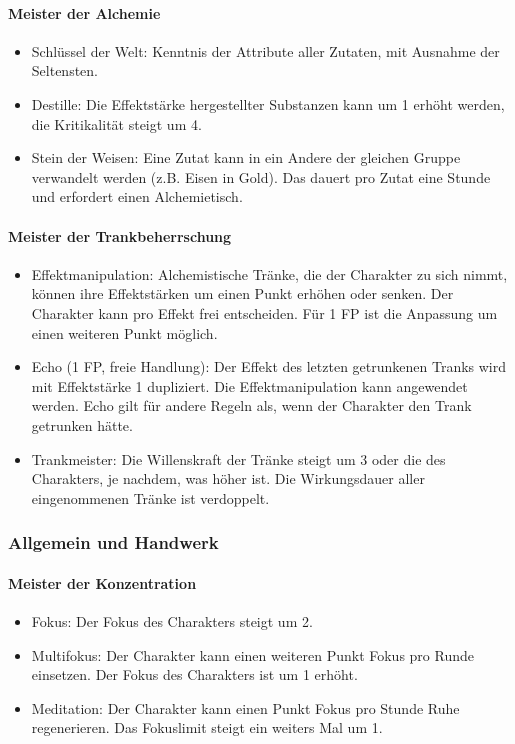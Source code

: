 \documentclass{article}
\begin{document}
\paragraph{Meister der Alchemie}

\begin{itemize}
\item Schlüssel der Welt: Kenntnis der Attribute aller Zutaten, mit Ausnahme der Seltensten.
\item Destille: Die Effektstärke hergestellter Substanzen kann um 1 erhöht werden, die Kritikalität steigt um 4.
\item Stein der Weisen: Eine Zutat kann in ein Andere der gleichen Gruppe verwandelt werden (z.B. Eisen in Gold). Das dauert pro Zutat eine Stunde und erfordert einen Alchemietisch.
\end{itemize}

\paragraph{Meister der Trankbeherrschung}

\begin{itemize}
\item Effektmanipulation: Alchemistische Tränke, die der Charakter zu sich nimmt, können ihre Effektstärken um einen Punkt erhöhen oder senken. Der Charakter kann pro Effekt frei entscheiden. Für 1 FP ist die Anpassung um einen weiteren Punkt möglich.
\item Echo (1 FP, freie Handlung): Der Effekt des letzten getrunkenen Tranks wird mit Effektstärke 1 dupliziert. Die Effektmanipulation kann angewendet werden. Echo gilt für andere Regeln als, wenn der Charakter den Trank getrunken hätte.
\item Trankmeister: Die Willenskraft der Tränke steigt um 3 oder die des Charakters, je nachdem, was höher ist. Die Wirkungsdauer aller eingenommenen Tränke ist verdoppelt.
\end{itemize}

\subsubsection{Allgemein und Handwerk}

\paragraph{Meister der Konzentration}

\begin{itemize}
\item Fokus: Der Fokus des Charakters steigt um 2.
\item Multifokus: Der Charakter kann einen weiteren Punkt Fokus pro Runde einsetzen. Der Fokus des Charakters ist um 1 erhöht.
\item Meditation: Der Charakter kann einen Punkt Fokus pro Stunde Ruhe regenerieren. Das Fokuslimit steigt ein weiters Mal um 1.
\end{itemize}
\end{document}
